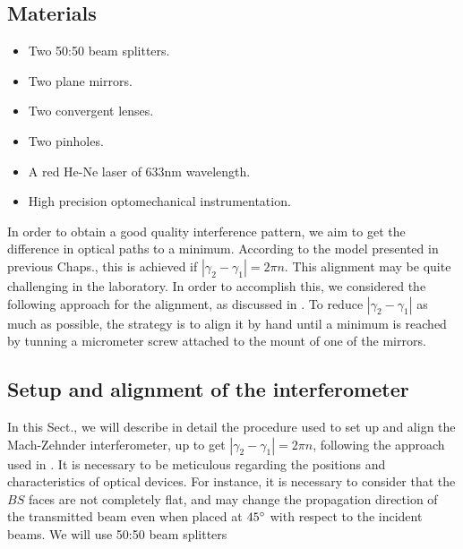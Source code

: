 \documentclass[12pt]{book}
\begin{document}
\subsection{Materials}
\begin{itemize}
\item Two 50:50 beam splitters.
\item Two plane mirrors.
\item Two convergent lenses.
\item Two pinholes.
\item A red He-Ne laser of 633nm wavelength.
\item High precision optomechanical instrumentation.
\end{itemize}

In order to obtain a good quality interference pattern, we aim to get the difference in optical paths to a minimum. According to the model presented in previous Chaps., this is achieved if $|\gamma_{2}-\gamma_{1}|=2\pi n$. This alignment may be quite challenging in the laboratory. In order to accomplish this, we considered the following approach for the alignment, as discussed in \cite{zuri}. To reduce $|\gamma_{2}-\gamma_{1}|$ as much as possible, the strategy is to align it by hand until a minimum is reached by tunning a micrometer screw attached to the mount of one of the mirrors.



\subsection{Setup and alignment of the interferometer}

In this Sect., we will describe in detail the procedure used to set up and align the Mach-Zehnder interferometer, up to get $|\gamma_{2}-\gamma_{1}|=2\pi n$, following the approach used in \cite{zuri}. It is necessary to be meticulous regarding the positions and characteristics of optical devices. For instance, it is necessary to consider that the $BS$ faces are not completely flat, and may change the propagation direction of the transmitted beam even when placed at $45\degree$ with respect to the incident beams. We will use 50:50 beam splitters
\end{document}
